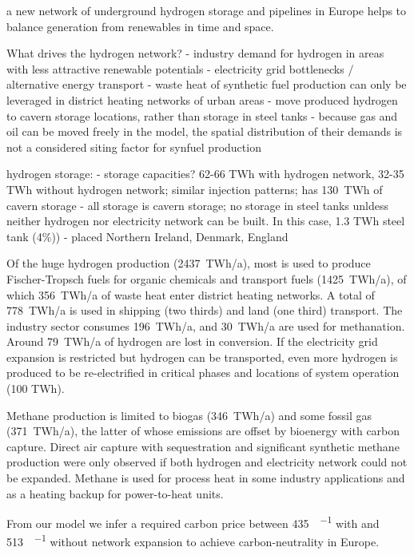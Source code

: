 a new network
of underground hydrogen storage and pipelines in Europe helps to balance
generation from renewables in time and space.

What drives the hydrogen network?
- industry demand for hydrogen in areas with less attractive renewable potentials
- electricity grid bottlenecks / alternative energy transport
- waste heat of synthetic fuel production can only be leveraged in district heating networks of urban areas
- move produced hydrogen to cavern storage locations, rather than storage in steel tanks
- because gas and oil can be moved freely in the model, the spatial distribution of their demands is not a considered siting factor for synfuel production

hydrogen storage:
- storage capacities? 62-66 TWh with hydrogen network, 32-35 TWh without hydrogen network; similar injection patterns; \cite{caglayanImpactDifferent2019} has 130~TWh of cavern storage
- all storage is cavern storage; no storage in steel tanks unldess neither hydrogen nor electricity network can be built. In this case, 1.3 TWh steel tank (4\%))
- placed Northern Ireland, Denmark, England

Of the huge hydrogen production (2437~TWh/a), most is used to produce
Fischer-Tropsch fuels for organic chemicals and transport fuels (1425~TWh/a), of
which 356~TWh/a of waste heat enter district heating networks. A total of
778~TWh/a is used in shipping (two thirds) and land (one third) transport. The
industry sector consumes 196~TWh/a, and 30~TWh/a are used for methanation.
Around 79~TWh/a of hydrogen are lost in conversion. If the electricity grid
expansion is restricted but hydrogen can be transported, even more hydrogen is
produced to be re-electrified in critical phases and locations of system
operation (100 TWh\el). 


Methane production is limited to biogas (346~TWh/a) and some fossil gas
(371~TWh/a), the latter of whose emissions are offset by bioenergy with carbon
capture. Direct air capture with sequestration and significant synthetic methane production
were only observed if both hydrogen and electricity network could not be
expanded. Methane is used for process heat in some industry applications and as
a heating backup for power-to-heat units.

From our model we infer a required carbon price between
\SI{435}{\sieuro\per\tco} with and \SI{513}{\sieuro\per\tco} without network
expansion to achieve carbon-neutrality in Europe.

